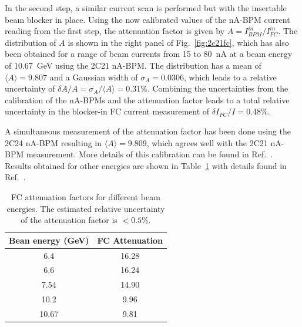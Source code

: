In the second step, a similar current scan is performed but with the insertable beam blocker in place. Using the now
calibrated values of the nA-BPM current reading from the first step, the attenuation factor is given by 
$A=I_{BPM}^{in}/{I_{FC}^{in}}$. The distribution of $A$ is shown in the right panel of Fig.~\ref{fig:2c21fc}, which has
also been  obtained for a range of beam currents from 15 to 80~nA at a beam energy of 10.67~GeV using the 2C21
nA-BPM.  The distribution has a mean of $\langle A\rangle=9.807$ and a  Gaussian width of $\sigma_A=0.0306$,
which leads to a relative uncertainty of $\delta A/A=\sigma_A/\langle A\rangle=0.31$\%. Combining the
uncertainties from the calibration of the nA-BPMs and the attenuation factor leads to a total relative uncertainty in
the blocker-in FC current measurement of $\delta I_{FC}/I=0.48$\%. 

A simultaneous measurement of the attenuation factor has been done using the 2C24 nA-BPM resulting in
$\langle A\rangle=9.809$, which agrees well with the 2C21 nA-BPM measurement. More details of this calibration
can be found in Ref.~\cite{note107}. Results obtained for other energies are shown in Table~\ref{tab:fcatt} with
details found in Ref.~\cite{notes}.  

\begin{table}[htb]
 \centering
 \begin{tabular}{|c|c|}
\hline
Bean energy (GeV)& FC Attenuation \\ \hline
6.4 &    16.28  \\ \hline
6.6 &  16.24 \\ \hline 
7.54  & 14.90 \\ \hline 
10.2  & 9.96 \\ \hline 
10.67   &  9.81 \\ \hline 
\end{tabular}
 \caption{FC attenuation factors for different beam energies. The estimated relative uncertainty of the attenuation
   factor is $<0.5$\%.} 
\label{tab:fcatt}
\end{table}
